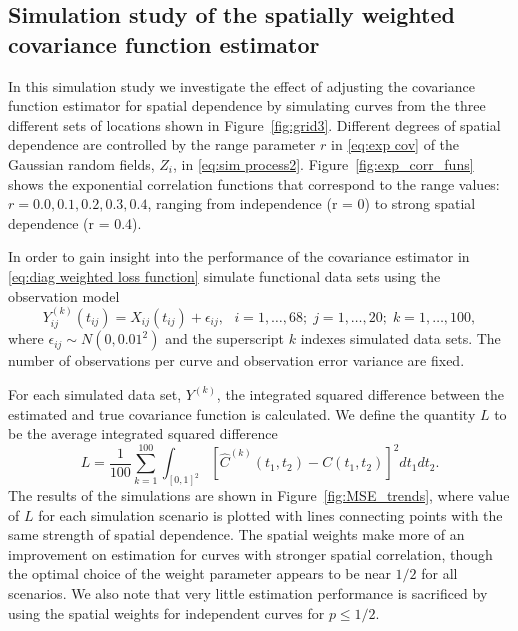 \subsection{Simulation study of the spatially weighted covariance function estimator} %
\label{sub:simulation covariance}

In this simulation study we investigate the effect of adjusting the covariance function estimator for spatial dependence by simulating curves from the three different sets of locations shown in Figure~\ref{fig:grid3}. Different degrees of spatial dependence are controlled by the range parameter $r$ in \eqref{eq:exp cov} of the Gaussian random fields, $Z_i$, in \eqref{eq:sim process2}. Figure~\ref{fig:exp_corr_funs} shows the exponential correlation functions that correspond to the range values: $r = 0.0, 0.1, 0.2, 0.3, 0.4$, ranging from independence (r = 0) to strong spatial dependence (r = 0.4).

In order to gain insight into the performance of the covariance estimator in \eqref{eq:diag weighted loss function} simulate functional data sets using the observation model 
\begin{equation}
	Y^{(k)}_{ij}(t_{ij}) = X_{ij}(t_{ij}) + \epsilon_{ij}, \mbox{ } i = 1, \dots, 68;\; j = 1, \dots, 20;\; k = 1, \dots, 100,
\end{equation}
where $\epsilon_{ij} \sim N(0, 0.01^2)$ and the superscript $k$ indexes simulated data sets. The number of observations per curve and observation error variance are fixed. 

For each simulated data set, $Y^{(k)}$, the integrated squared difference between the estimated and true covariance function is calculated. We define the quantity $L$ to be the average integrated squared difference
\begin{equation}
	L = \frac{1}{100}\sum_{k=1}^{100}\int_{[0,1]^2} [\hat{C}^{(k)}(t_1, t_2) - C(t_1,t_2)]^2dt_1dt_2.
\end{equation}
The results of the simulations are shown in Figure~\ref{fig:MSE_trends}, where value of $L$ for each simulation scenario is plotted with lines connecting points with the same strength of spatial dependence. The spatial weights make more of an improvement on estimation for curves with stronger spatial correlation, though the optimal choice of the weight parameter appears to be near $1/2$ for all scenarios. We also note that very little estimation performance is sacrificed by using the spatial weights for independent curves for $p \leq 1/2$.

